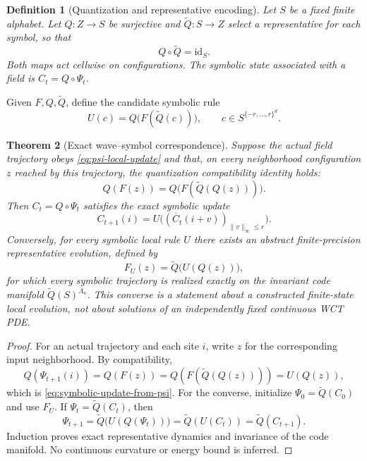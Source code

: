 \documentclass[12pt]{article}
\newtheorem{theorem}{Theorem}[section]
\newtheorem{definition}[theorem]{Definition}
\begin{document}
\begin{definition}[Quantization and representative encoding]
Let $S$ be a fixed finite alphabet. Let
$Q:Z\to S$ be surjective and $\widetilde Q:S\to Z$
select a representative for each symbol, so that
\[
Q\circ\widetilde Q=\mathrm{id}_S.
\]
Both maps act cellwise on configurations. The symbolic state associated
with a field is $C_t=Q\circ\Psi_t$.
\end{definition}

Given $F,Q,\widetilde Q$, define the candidate symbolic rule
\begin{equation}
U(c)=Q\bigl(F(\widetilde Q(c))\bigr),\qquad
c\in S^{\{-r,\ldots,r\}^d}.
\label{eq:U-from-F}
\end{equation}

\begin{theorem}[Exact wave--symbol correspondence]
\label{thm:wave-symbol-isomorphism}
Suppose the actual field trajectory obeys \eqref{eq:psi-local-update}
and that, on every neighborhood configuration $z$ reached by this
trajectory, the \emph{quantization compatibility} identity holds:
\begin{equation}
Q(F(z))=Q\bigl(F(\widetilde Q(Q(z)))\bigr).
\label{eq:quantization-compatibility}
\end{equation}
Then $C_t=Q\circ\Psi_t$ satisfies the exact symbolic update
\begin{equation}
C_{t+1}(i)=U\bigl((\overline C_t(i+v))_{\|v\|_\infty\le r}\bigr).
\label{eq:symbolic-update-from-psi}
\end{equation}
Conversely, for every symbolic local rule $U$ there exists an
\emph{abstract} finite-precision representative evolution, defined by
\[
F_U(z)=\widetilde Q\bigl(U(Q(z))\bigr),
\]
for which every symbolic trajectory is realized exactly on the invariant
code manifold $\widetilde Q(S)^{\Lambda_n}$. This converse is a statement
about a constructed finite-state local evolution, not about solutions of
an independently fixed continuous WCT PDE.
\end{theorem}

\begin{proof}
For an actual trajectory and each site $i$, write $z$ for the
corresponding input neighborhood. By compatibility,
\[
Q(\Psi_{t+1}(i))=Q(F(z))
=Q(F(\widetilde Q(Q(z))))=U(Q(z)),
\]
which is \eqref{eq:symbolic-update-from-psi}.
For the converse, initialize $\Psi_0=\widetilde Q(C_0)$ and use $F_U$.
If $\Psi_t=\widetilde Q(C_t)$, then
\[
\Psi_{t+1}=\widetilde Q\bigl(U(Q(\Psi_t))\bigr)
=\widetilde Q(U(C_t))=\widetilde Q(C_{t+1}).
\]
Induction proves exact representative dynamics and invariance of the
code manifold. No continuous curvature or energy bound is inferred.
\end{proof}
\end{document}

